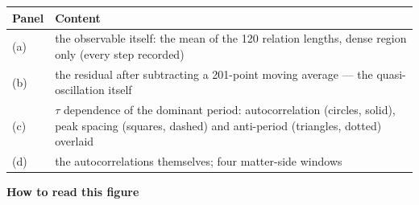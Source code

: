 \documentclass[
  10pt,
]{article}
\newcounter{none} %
\begin{document}
{\def\LTcaptype{none} %
\begin{longtable}[]{@{}
  >{\raggedright\arraybackslash}p{}
  >{\raggedright\arraybackslash}p{}@{}}
\toprule\noalign{}
\begin{minipage}[b]{\linewidth}\raggedright
Panel
\end{minipage} & \begin{minipage}[b]{\linewidth}\raggedright
Content
\end{minipage} \\
\midrule\noalign{}
\endhead
\bottomrule\noalign{}
\endlastfoot
(a) & the observable itself: the mean of the 120 relation lengths, dense
region only (every step recorded) \\
(b) & the residual after subtracting a 201-point moving average --- the
quasi-oscillation itself \\
(c) & \(\tau\) dependence of the dominant period: autocorrelation
(circles, solid), peak spacing (squares, dashed) and anti-period
(triangles, dotted) overlaid \\
(d) & the autocorrelations themselves; four matter-side windows \\
\end{longtable}
}

\textbf{How to read this figure}
\end{document}
